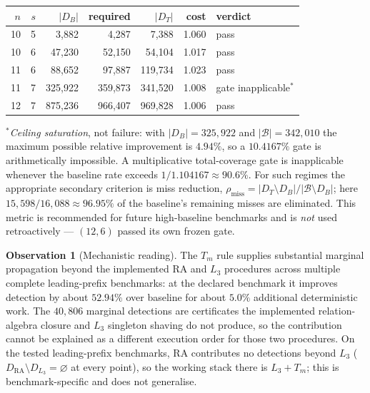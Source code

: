 \documentclass[11pt,a4paper,oneside]{report}
\theoremstyle{definition}
\newtheorem{observation}[theorem]{Observation}
\begin{document}
\begin{center}
\begin{tabular}{@{}rrrrrrl@{}}
\toprule
$n$ & $s$ & $|D_B|$ & required & $|D_T|$ & cost & verdict \\
\midrule
10 & 5 & 3{,}882 & 4{,}287 & 7{,}388 & 1.060 & pass \\
10 & 6 & 47{,}230 & 52{,}150 & 54{,}104 & 1.017 & pass \\
11 & 6 & 88{,}652 & 97{,}887 & 119{,}734 & 1.023 & pass \\
11 & 7 & 325{,}922 & 359{,}873 & 341{,}520 & 1.008 & gate inapplicable$^\ast$ \\
12 & 7 & 875{,}236 & 966{,}407 & 969{,}828 & 1.006 & pass \\
\bottomrule
\end{tabular}
\end{center}

\noindent$^\ast$\emph{Ceiling saturation}, not failure: with
$|D_B|=325{,}922$ and $|\mathcal B|=342{,}010$ the maximum possible relative
improvement is $4.94\%$, so a $10.4167\%$ gate is arithmetically impossible. A
multiplicative total-coverage gate is inapplicable whenever the baseline rate
exceeds $1/1.104167\approx90.6\%$. For such regimes the appropriate secondary
criterion is miss reduction,
$\rho_{\mathrm{miss}}=|D_T\setminus D_B|/|\mathcal B\setminus D_B|$; here
$15{,}598/16{,}088\approx96.95\%$ of the baseline's remaining misses are
eliminated. This metric is recommended for future high-baseline benchmarks and is
\emph{not} used retroactively --- $(12,6)$ passed its own frozen gate.

\begin{observation}[Mechanistic reading]
\label{p5-obs:f3}
The $T_m$ rule supplies substantial marginal propagation beyond the implemented
RA and $L_3$ procedures across multiple complete leading-prefix benchmarks: at the
declared benchmark it improves detection by about $52.94\%$ over baseline for
about $5.0\%$ additional deterministic work. The $40{,}806$ marginal detections
are certificates the implemented relation-algebra closure and $L_3$ singleton
shaving do not produce, so the contribution cannot be explained as a different
execution order for those two procedures. On the tested leading-prefix
benchmarks, RA contributes no detections beyond $L_3$
($D_{\mathrm{RA}}\setminus D_{L_3}=\varnothing$ at every point), so the working
stack there is $L_3+T_m$; this is benchmark-specific and does not generalise.
\end{observation}
\end{document}
